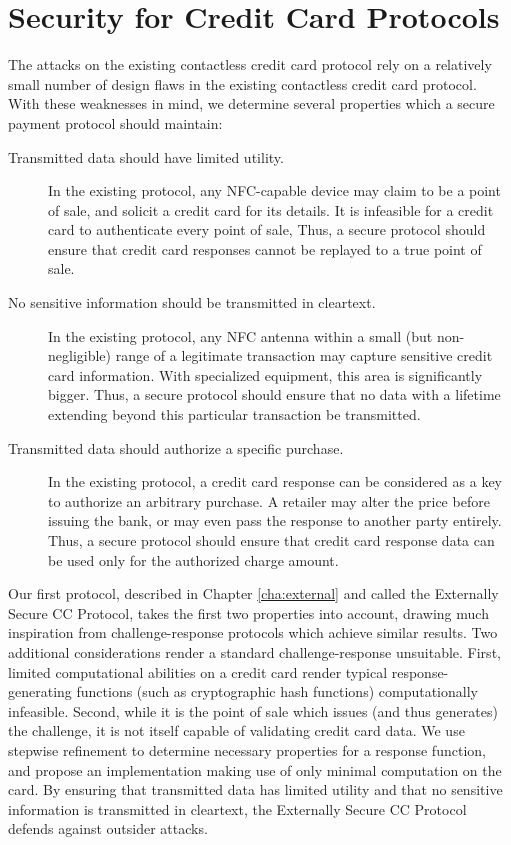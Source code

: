 \section{Security for Credit Card Protocols}
\label{sec:intro-approach-security}

The attacks on the existing contactless credit card protocol rely on a relatively small number of design flaws in the existing contactless credit card protocol.
With these weaknesses in mind, we determine several properties which a secure payment protocol should maintain:

\begin{description}
    \item[Transmitted data should have limited utility.]
        In the existing protocol, any NFC-capable device may claim to be a point of sale, and solicit a credit card for its details.
        It is infeasible for a credit card to authenticate every point of sale,
        Thus, a secure protocol should ensure that credit card responses cannot be replayed to a true point of sale.
    \item[No sensitive information should be transmitted in cleartext.]
        In the existing protocol, any NFC antenna within a small (but non-negligible) range of a legitimate transaction may capture sensitive credit card information.
        With specialized equipment, this area is significantly bigger\cite{brown2013evaluating}.
        Thus, a secure protocol should ensure that no data with a lifetime extending beyond this particular transaction be transmitted.
    \item[Transmitted data should authorize a specific purchase.]
        In the existing protocol, a credit card response can be considered as a key to authorize an arbitrary purchase.
        A retailer may alter the price before issuing the bank, or may even pass the response to another party entirely.
        Thus, a secure protocol should ensure that credit card response data can be used only for the authorized charge amount.
\end{description}

Our first protocol, described in Chapter \ref{cha:external} and called the Externally Secure CC Protocol, takes the first two properties into account,
    drawing much inspiration from challenge-response protocols which achieve similar results.
Two additional considerations render a standard challenge-response unsuitable.
First, limited computational abilities on a credit card render typical response-generating functions
    (such as cryptographic hash functions) computationally infeasible.
Second, while it is the point of sale which issues (and thus generates) the challenge, it is not itself capable of validating credit card data.
We use stepwise refinement to determine necessary properties for a response function, and propose an implementation making use of only minimal computation on the card.
By ensuring that transmitted data has limited utility and that no sensitive information is transmitted in cleartext,
    the Externally Secure CC Protocol defends against outsider attacks.

